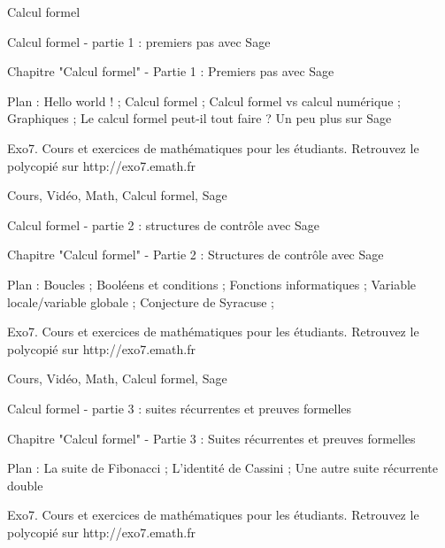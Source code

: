 
   Calcul formel




Calcul formel - partie 1 : premiers pas avec Sage



Chapitre "Calcul formel" - Partie 1 : Premiers pas avec Sage

Plan : Hello world ! ; Calcul formel ; Calcul formel vs calcul numérique ; Graphiques ; 
Le calcul formel peut-il tout faire ? Un peu plus sur Sage

Exo7. Cours et exercices de mathématiques pour les étudiants.
Retrouvez le polycopié sur http://exo7.emath.fr


Cours, Vidéo, Math, Calcul formel, Sage





Calcul formel - partie 2 : structures de contrôle avec Sage



Chapitre "Calcul formel" - Partie 2 : Structures de contrôle avec Sage

Plan : Boucles ;  Booléens et conditions ; Fonctions informatiques ; 
Variable locale/variable globale ; Conjecture de Syracuse ; 

Exo7. Cours et exercices de mathématiques pour les étudiants.
Retrouvez le polycopié sur http://exo7.emath.fr


Cours, Vidéo, Math, Calcul formel, Sage





Calcul formel - partie 3 : suites récurrentes et preuves formelles



Chapitre "Calcul formel" - Partie 3 : Suites récurrentes et preuves formelles

Plan : La suite de Fibonacci ; L’identité de Cassini ; 
Une autre suite récurrente double

Exo7. Cours et exercices de mathématiques pour les étudiants.
Retrouvez le polycopié sur http://exo7.emath.fr

